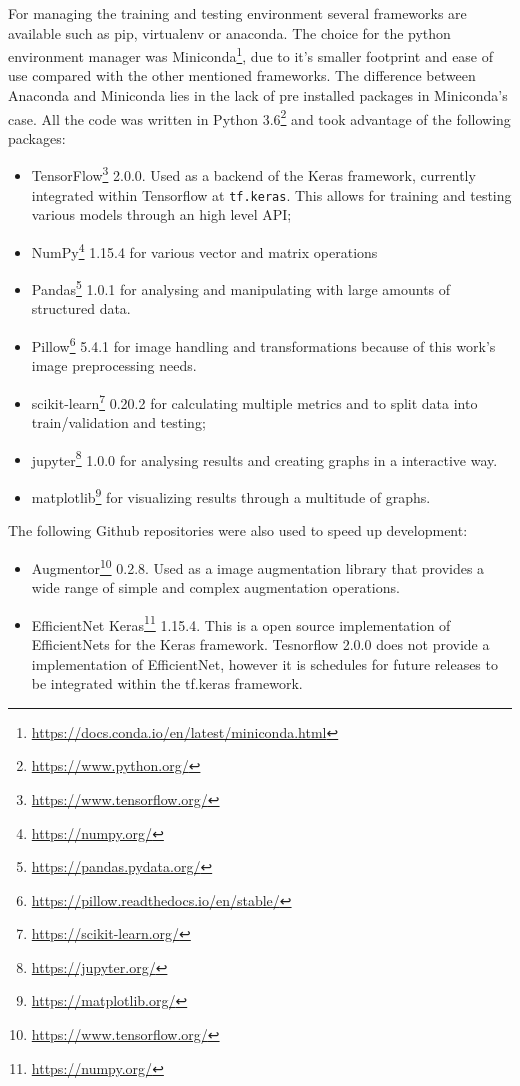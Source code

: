     For managing the training and testing environment several frameworks are available such as pip, virtualenv or anaconda. The choice for the python environment manager was Miniconda\footnote{\url{https://docs.conda.io/en/latest/miniconda.html}}, due to it's smaller footprint and ease of use compared with the other mentioned frameworks. The difference between Anaconda and Miniconda lies in the lack of pre installed packages in Miniconda's case. 
    All the code was written in Python 3.6\footnote{\url{https://www.python.org/}} and took advantage of the following packages:
    
    \begin{itemize}
        \item TensorFlow\footnote{\url{https://www.tensorflow.org/}} 2.0.0. Used as a backend of the Keras framework, currently integrated within Tensorflow at \verb|tf.keras|. This allows for training and testing various models through an high level API;
        \item NumPy\footnote{\url{https://numpy.org/}} 1.15.4 for various vector and matrix operations
        \item Pandas\footnote{\url{https://pandas.pydata.org/}} 1.0.1 for analysing and manipulating with large amounts of structured data.
        \item Pillow\footnote{\url{https://pillow.readthedocs.io/en/stable/}} 5.4.1 for image handling and transformations because of this work's image preprocessing needs.
        \item scikit-learn\footnote{\url{https://scikit-learn.org/}} 0.20.2 for calculating multiple metrics and to split data into train/validation and testing;
        \item jupyter\footnote{\url{https://jupyter.org/}} 1.0.0 for analysing results and creating graphs in a interactive way.
        \item matplotlib\footnote{\url{https://matplotlib.org/}} for visualizing results through  a multitude of graphs.
    \end{itemize}
    
    The following Github repositories were also used to speed up development: 
    \begin{itemize}
        \item Augmentor\footnote{\url{https://www.tensorflow.org/}} 0.2.8. Used as a image augmentation library that provides a wide range of simple and complex augmentation operations. 
        \item EfficientNet Keras\footnote{\url{https://numpy.org/}} 1.15.4. This is a open source implementation of EfficientNets for the Keras framework. Tesnorflow 2.0.0 does not provide a implementation of EfficientNet, however it is schedules for future releases to be integrated within the tf.keras framework.
    \end{itemize}
    
    
